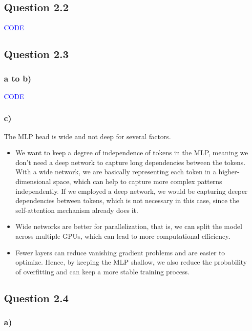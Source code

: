 \documentclass{article}
\begin{document}
\subsection*{Question 2.2}

\textcolor{blue}{CODE}

\subsection*{Question 2.3}

\subsubsection*{a to b)}
\textcolor{blue}{CODE}

\subsubsection*{c)}

The MLP head is wide and not deep for several factors.
\begin{itemize}
    \item We want to keep a degree of independence of tokens in the MLP, meaning we don't need a deep network to capture
    long dependencies between the tokens. With a wide network, we are basically representing each token in a higher-dimensional
    space, which can help to capture more complex patterns independently. If we employed a deep network, we would be
    capturing deeper dependencies between tokens, which is not necessary in this case, since the self-attention mechanism already
    does it.
    \item Wide networks are better for parallelization, that is, we can split the model across multiple
    GPUs, which can lead to more computational efficiency. 
    \item Fewer layers can reduce vanishing gradient problems and are easier to optimize. Hence, by keeping the MLP shallow, we also reduce the probability of overfitting
    and can keep a more stable training process.
\end{itemize}


\subsection*{Question 2.4}

\subsubsection*{a)}
\end{document}
